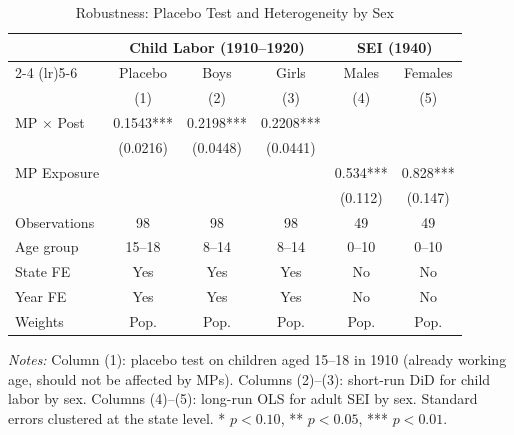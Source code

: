 \begin{table}[H]
\centering
\caption{Robustness: Placebo Test and Heterogeneity by Sex}
\begin{threeparttable}
\begin{tabular}{lccccc}
\toprule
 & \multicolumn{3}{c}{Child Labor (1910--1920)} & \multicolumn{2}{c}{SEI (1940)} \\
\cmidrule(lr){2-4} \cmidrule(lr){5-6}
 & Placebo & Boys & Girls & Males & Females \\
 & (1) & (2) & (3) & (4) & (5) \\
\midrule
MP $\times$ Post & 0.1543*** & 0.2198*** & 0.2208*** & & \\
 & (0.0216) & (0.0448) & (0.0441) & & \\[3pt]
MP Exposure & & & & 0.534*** & 0.828*** \\
 & & & & (0.112) & (0.147) \\[6pt]
Observations & 98 & 98 & 98 & 49 & 49 \\
Age group & 15--18 & 8--14 & 8--14 & 0--10 & 0--10 \\
State FE & Yes & Yes & Yes & No & No \\
Year FE & Yes & Yes & Yes & No & No \\
Weights & Pop. & Pop. & Pop. & Pop. & Pop. \\
\bottomrule
\end{tabular}
\begin{tablenotes}[flushleft]
\small
\item \textit{Notes:} Column (1): placebo test on children aged 15--18 in 1910 (already working age, should not be affected by MPs). Columns (2)--(3): short-run DiD for child labor by sex. Columns (4)--(5): long-run OLS for adult SEI by sex. Standard errors clustered at the state level. * $p<0.10$, ** $p<0.05$, *** $p<0.01$.
\end{tablenotes}
\end{threeparttable}
\label{tab:robustness}
\end{table}
